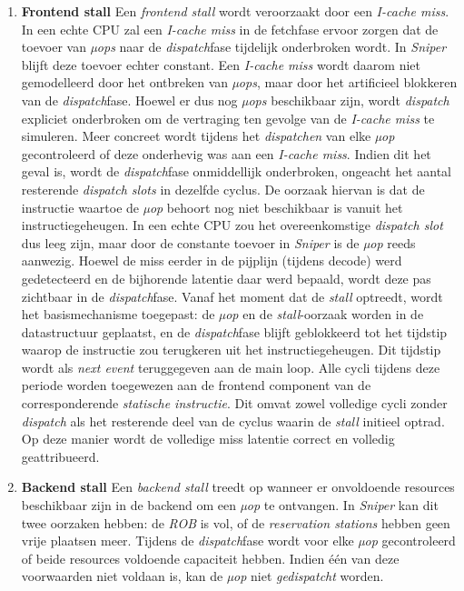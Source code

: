 \documentclass[12pt,a4paper,faculty=ea,language=nl]{ugent-doc}
\begin{document}
\begin{enumerate}
    \item{\textbf{Frontend stall}} Een \textit{frontend stall} wordt veroorzaakt door een \textit{I-cache miss}. In een echte CPU zal een \textit{I-cache miss} in de fetchfase ervoor zorgen dat de toevoer van \textit{µops} naar de \textit{dispatch}fase tijdelijk onderbroken wordt. In \textit{Sniper} blijft deze toevoer echter constant.
Een \textit{I-cache miss} wordt daarom niet gemodelleerd door het ontbreken van \textit{µops}, maar door het artificieel blokkeren van de \textit{dispatch}fase. Hoewel er dus nog \textit{µops} beschikbaar zijn, wordt \textit{dispatch} expliciet onderbroken om de vertraging ten gevolge van de \textit{I-cache miss} te simuleren.
Meer concreet wordt tijdens het \textit{dispatchen} van elke \textit{µop} gecontroleerd of deze onderhevig was aan een \textit{I-cache miss}. Indien dit het geval is, wordt de \textit{dispatch}fase onmiddellijk onderbroken, ongeacht het aantal resterende \textit{dispatch slots} in dezelfde cyclus.
De oorzaak hiervan is dat de instructie waartoe de \textit{µop} behoort nog niet beschikbaar is vanuit het instructiegeheugen. In een echte CPU zou het overeenkomstige \textit{dispatch slot} dus leeg zijn, maar door de constante toevoer in \textit{Sniper} is de \textit{µop} reeds aanwezig. Hoewel de miss eerder in de pijplijn (tijdens decode) werd gedetecteerd en de bijhorende latentie daar werd bepaald, wordt deze pas zichtbaar in de \textit{dispatch}fase.
Vanaf het moment dat de \textit{stall} optreedt, wordt het basismechanisme toegepast: de \textit{µop} en de \textit{stall}-oorzaak worden in de datastructuur geplaatst, en de \textit{dispatch}fase blijft geblokkeerd tot het tijdstip waarop de instructie zou terugkeren uit het instructiegeheugen. Dit tijdstip wordt als \textit{next event} teruggegeven aan de main loop.
Alle cycli tijdens deze periode worden toegewezen aan de frontend component van de corresponderende \textit{statische instructie}. Dit omvat zowel volledige cycli zonder \textit{dispatch} als het resterende deel van de cyclus waarin de \textit{stall} initieel optrad.
Op deze manier wordt de volledige miss latentie correct en volledig geattribueerd.
    \item{\textbf{Backend stall}} Een \textit{backend stall} treedt op wanneer er onvoldoende resources beschikbaar zijn in de backend om een \textit{µop} te ontvangen. In \textit{Sniper} kan dit twee oorzaken hebben: de \textit{ROB} is vol, of de \textit{reservation stations} hebben geen vrije plaatsen meer.
Tijdens de \textit{dispatch}fase wordt voor elke \textit{µop} gecontroleerd of beide resources voldoende capaciteit hebben. Indien één van deze voorwaarden niet voldaan is, kan de \textit{µop} niet \textit{gedispatcht} worden.

\end{enumerate}
\end{document}
